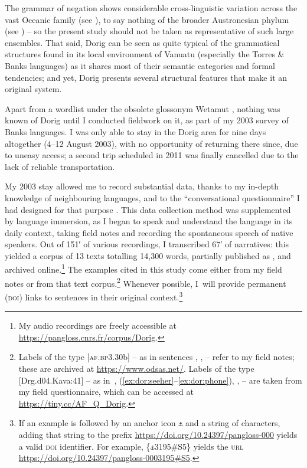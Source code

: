 \documentclass[output=paper,colorlinks,citecolor=brown,draft]{langscibook}
\begin{document}
The grammar of negation shows considerable cross-linguistic variation across the vast Oceanic family (see \citealt{HovdhaugenMosel1999}), to say nothing of the broader Austronesian phylum (see \citealt{VossenAuwera2014}) – so the present study should not be taken as representative of such large ensembles. That said, Dorig can be seen as quite typical of the grammatical structures found in its local environment of Vanuatu (especially the Torres \& Banks languages) as it shares most of their semantic categories and formal tendencies; and yet, Dorig presents several structural features that make it an original system.

Apart from a wordlist under the obsolete glossonym Wetamut \citep{Tryon1976}, nothing was known of Dorig until I conducted fieldwork on it, as part of my 2003 survey of Banks languages. I was only able to stay in the Dorig area for nine days altogether (4–12 August 2003), with no opportunity of returning there since, due to uneasy access; a second trip scheduled in 2011 was finally cancelled due to the lack of reliable transportation.

My 2003 stay allowed me to record substantial data, thanks to my in-depth knowledge of neighbouring languages, and to the “conversational questionnaire” I had designed for that purpose \citep{François2019}. This data collection method was supplemented by language immersion, as I began to speak and understand the language in its daily context, taking field notes and recording the spontaneous speech of native speakers. Out of 151′ of various recordings, I transcribed 67′ of narratives: this yielded a corpus of 13 texts totalling 14,300 words, partially published as \citet{François2008}, and archived online.\footnote{My audio recordings are freely accessible at \href{https://pangloss.cnrs.fr/corpus/Dorig?lang=en&seeMore=true&mode=pro}{https://pangloss.cnrs.fr/corpus/Dorig}.} The examples cited in this study come either from my field notes or from that text corpus.\footnote{Labels of the type [\textsc{af.bp3}.30b] -- as in sentences , ,  -- refer to my field notes; these are archived at \url{https://www.odsas.net/}. Labels of the type [Drg.d04.Kava:41] -- as in~, (\ref{ex:dor:seeher}--\ref{ex:dor:phone}), ,  -- are taken from my field questionnaire, which can be accessed at \url{https://tiny.cc/AF_Q_Dorig}.} Whenever possible, I~will provide permanent (\textsc{doi}) links to sentences in their original context.\footnote{If an example is followed by an anchor icon \texttt{⚓} and a string of characters, adding that string to the prefix \url{https://doi.org/10.24397/pangloss-000} yields a valid \textsc{doi} identifier. For example, {\{\texttt{⚓}3195\#S5\}} yields the \textsc{url} \url{https://doi.org/10.24397/pangloss-0003195\#S5}.} 
\end{document}
